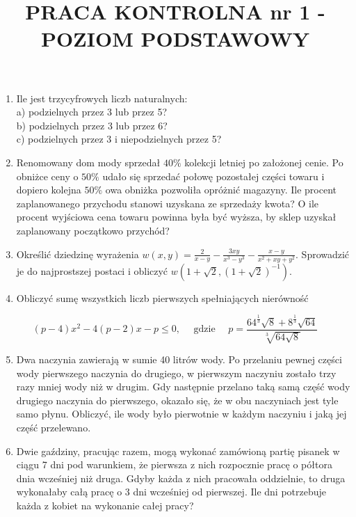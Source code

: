 \documentclass[10pt]{article}
\title{PRACA KONTROLNA nr 1 - POZIOM PODSTAWOWY }
\author{}
\date{}
\begin{document}
\maketitle
\begin{enumerate}
  \item Ile jest trzycyfrowych liczb naturalnych:\\
a) podzielnych przez 3 lub przez 5?\\
b) podzielnych przez 3 lub przez 6?\\
c) podzielnych przez 3 i niepodzielnych przez 5?
  \item Renomowany dom mody sprzedał $40 \%$ kolekcji letniej po założonej cenie. Po obniżce ceny o $50 \%$ udało się sprzedać połowę pozostałej części towaru i dopiero kolejna $50 \%$ owa obniżka pozwoliła opróżnić magazyny. Ile procent zaplanowanego przychodu stanowi uzyskana ze sprzedaży kwota? O ile procent wyjściowa cena towaru powinna była być wyższa, by sklep uzyskał zaplanowany początkowo przychód?
  \item Określić dziedzinę wyrażenia $w(x, y)=\frac{2}{x-y}-\frac{3 x y}{x^{3}-y^{3}}-\frac{x-y}{x^{2}+x y+y^{2}}$. Sprowadzić je do najprostszej postaci i obliczyć $w\left(1+\sqrt{2},(1+\sqrt{2})^{-1}\right)$.
  \item Obliczyć sumę wszystkich liczb pierwszych spełniających nierówność
\end{enumerate}

$$
(p-4) x^{2}-4(p-2) x-p \leqslant 0, \quad \text { gdzie } \quad p=\frac{64^{\frac{1}{3}} \sqrt{8}+8^{\frac{1}{3}} \sqrt{64}}{\sqrt[3]{64 \sqrt{8}}}
$$

\begin{enumerate}
  \setcounter{enumi}{4}
  \item Dwa naczynia zawierają w sumie 40 litrów wody. Po przelaniu pewnej części wody pierwszego naczynia do drugiego, w pierwszym naczyniu zostało trzy razy mniej wody niż w drugim. Gdy następnie przelano taką samą część wody drugiego naczynia do pierwszego, okazało się, że w obu naczyniach jest tyle samo płynu. Obliczyć, ile wody było pierwotnie w każdym naczyniu i jaką jej część przelewano.
  \item Dwie gaździny, pracując razem, mogą wykonać zamówioną partię pisanek w ciągu 7 dni pod warunkiem, że pierwsza z nich rozpocznie pracę o półtora dnia wcześniej niż druga. Gdyby każda z nich pracowała oddzielnie, to druga wykonałaby całą pracę o 3 dni wcześniej od pierwszej. Ile dni potrzebuje każda z kobiet na wykonanie całej pracy?
\end{enumerate}
\end{document}
